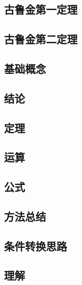 \documentclass[a4paper,12pt]{article}
\begin{document}
    \subsection{古鲁金第一定理}

    \subsection{古鲁金第二定理}

    \subsection{基础概念}

    \begin{enumerate}
    \end{enumerate}

    \subsection{结论}

    \begin{enumerate}
    \end{enumerate}

    \subsection{定理}

    \begin{enumerate}
    \end{enumerate}

    \subsection{运算}

    \begin{enumerate}

    \end{enumerate}

    \subsection{公式}

    \begin{enumerate}

    \end{enumerate}

    \subsection{方法总结}

    \begin{enumerate}

    \end{enumerate}

    \subsection{条件转换思路}

    \begin{enumerate}

    \end{enumerate}

    \subsection{理解}

    \begin{enumerate}
    \end{enumerate}
\end{document}
